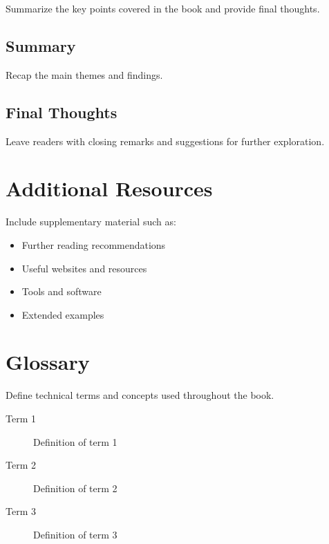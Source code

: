 \documentclass[11pt,a4paper,oneside]{book}
\begin{document}
Summarize the key points covered in the book and provide final thoughts.

\section{Summary}
\label{sec:summary}

Recap the main themes and findings.

\section{Final Thoughts}
\label{sec:final}

Leave readers with closing remarks and suggestions for further exploration.


\backmatter

\appendix

\chapter{Additional Resources}
\label{app:resources}

Include supplementary material such as:
\begin{itemize}
    \item Further reading recommendations
    \item Useful websites and resources
    \item Tools and software
    \item Extended examples
\end{itemize}

\chapter{Glossary}
\label{app:glossary}

Define technical terms and concepts used throughout the book.

\begin{description}
    \item[Term 1] Definition of term 1
    \item[Term 2] Definition of term 2
    \item[Term 3] Definition of term 3
\end{description}

\printbibliography[heading=bibintoc, title={References and Further Reading}]
\end{document}
